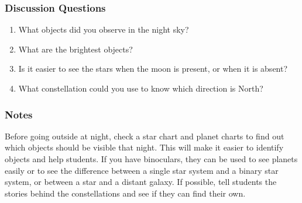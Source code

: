 \subsubsection*{Discussion Questions}
\begin{enumerate}
\item{What objects did you observe in the night sky?}
\item{What are the brightest objects?}
\item{Is it easier to see the stars when the moon is present, or when it is absent?}
\item{What constellation could you use to know which direction is North?}
\end{enumerate}

\subsubsection*{Notes}
Before going outside at night, check a star chart and planet charts to find out which objects should be visible that night.  This will make it easier to identify objects and help students.  If you have binoculars, they can be used to see planets easily or to see the difference between a single star system and a binary star system, or between a star and a distant galaxy.  If possible, tell students the stories behind the constellations and see if they can find their own.
